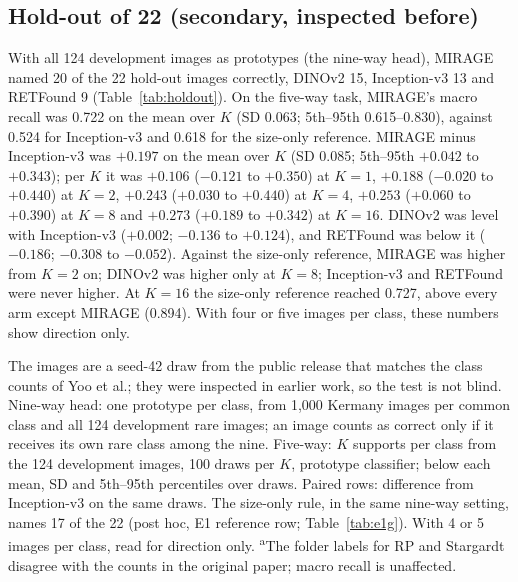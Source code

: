 \documentclass[conference]{IEEEtran}
\newcommand{\fnRS}{\textsuperscript{a}}
\begin{document}
\subsection{Hold-out of 22 (secondary, inspected before)}
With all 124 development images as prototypes (the nine-way head), MIRAGE named 20 of the 22 hold-out images correctly, DINOv2 15, Inception-v3 13 and RETFound 9 (Table~\ref{tab:holdout}).
On the five-way task, MIRAGE's macro recall was 0.722 on the mean over $K$ (SD 0.063; 5th--95th 0.615--0.830), against 0.524 for Inception-v3 and 0.618 for the size-only reference. MIRAGE minus Inception-v3 was $+0.197$ on the mean over $K$ (SD 0.085; 5th--95th $+0.042$ to $+0.343$); per $K$ it was $+0.106$ ($-0.121$ to $+0.350$) at $K=1$, $+0.188$ ($-0.020$ to $+0.440$) at $K=2$, $+0.243$ ($+0.030$ to $+0.440$) at $K=4$, $+0.253$ ($+0.060$ to $+0.390$) at $K=8$ and $+0.273$ ($+0.189$ to $+0.342$) at $K=16$.
DINOv2 was level with Inception-v3 ($+0.002$; $-0.136$ to $+0.124$), and RETFound was below it ($-0.186$; $-0.308$ to $-0.052$). Against the size-only reference, MIRAGE was higher from $K=2$ on; DINOv2 was higher only at $K=8$; Inception-v3 and RETFound were never higher. At $K=16$ the size-only reference reached 0.727, above every arm except MIRAGE (0.894). With four or five images per class, these numbers show direction only.

\begin{table}[t]
\caption{Hold-out of 22 images (5 CSC, 5 MH, 4 MacTel, 4 Stargardt, 4 RP): locked nine-way exact counts per class and arm, with five-way macro recall per $K$ beside them.}
\label{tab:holdout}
\centering\footnotesize
\setlength{\tabcolsep}{3pt}
\resizebox{\textwidth}{!}{}
\par\smallskip
\parbox{\textwidth}{\footnotesize The images are a seed-42 draw from the public release that matches the class counts of Yoo et al.; they were inspected in earlier work, so the test is not blind. Nine-way head: one prototype per class, from 1,000 Kermany images per common class and all 124 development rare images; an image counts as correct only if it receives its own rare class among the nine. Five-way: $K$ supports per class from the 124 development images, 100 draws per $K$, prototype classifier; below each mean, SD and 5th--95th percentiles over draws. Paired rows: difference from Inception-v3 on the same draws. The size-only rule, in the same nine-way setting, names 17 of the 22 (post hoc, E1 reference row; Table~\ref{tab:e1g}). With 4 or 5 images per class, read for direction only. \fnRS The folder labels for RP and Stargardt disagree with the counts in the original paper; macro recall is unaffected.}
\end{table}
\end{document}
